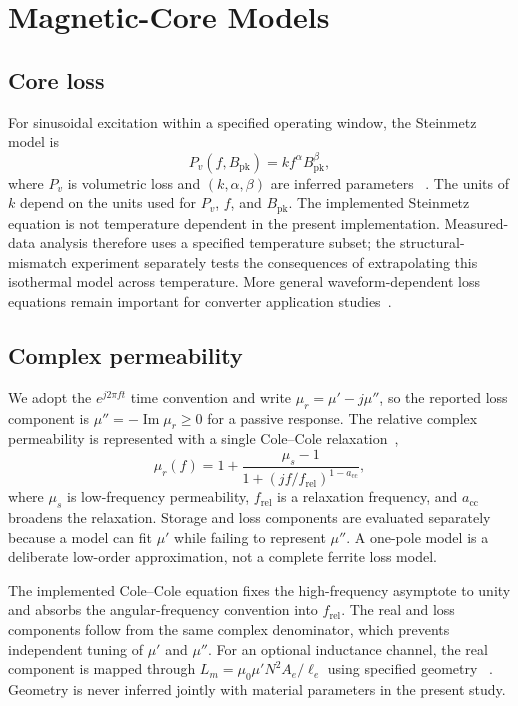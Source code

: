 \hypertarget{magnetic-core-models}{%
\section{Magnetic-Core Models}\label{magnetic-core-models}}

\hypertarget{core-loss}{%
\subsection{Core loss}\label{core-loss}}

For sinusoidal excitation within a specified operating window, the
Steinmetz model is
\[P_v(f,B_{\mathrm{pk}})=k f^{\alpha}B_{\mathrm{pk}}^{\beta},
  \label{eq:steinmetz}\] where \(P_v\) is volumetric loss and
\((k,\alpha,\beta)\) are inferred parameters ~\citep{steinmetz1892}. The
units of \(k\) depend on the units used for \(P_v\), \(f\), and
\(B_{\mathrm{pk}}\). The implemented Steinmetz equation is not
temperature dependent in the present implementation. Measured-data
analysis therefore uses a specified temperature subset; the
structural-mismatch experiment separately tests the consequences of
extrapolating this isothermal model across temperature. More general
waveform-dependent loss equations remain important for converter
application studies~\citep{reinert2001, muehlethaler2012}.

\hypertarget{complex-permeability}{%
\subsection{Complex permeability}\label{complex-permeability}}

We adopt the \(e^{j2\pi ft}\) time convention and write
\(\mu_r=\mu'-j\mu''\), so the reported loss component is
\(\mu''=-\operatorname{Im}\mu_r\geq0\) for a passive response. The
relative complex permeability is represented with a single Cole--Cole
relaxation~\citep{cole1941}, \[\mu_r(f)=1+\frac{\mu_s-1}
 {1+\left(jf/f_{\mathrm{rel}}\right)^{1-a_{\mathrm{cc}}}},
 \label{eq:colecole}\] where \(\mu_s\) is low-frequency permeability,
\(f_{\mathrm{rel}}\) is a relaxation frequency, and \(a_{\mathrm{cc}}\)
broadens the relaxation. Storage and loss components are evaluated
separately because a model can fit \(\mu'\) while failing to represent
\(\mu''\). A one-pole model is a deliberate low-order approximation, not
a complete ferrite loss model.

The implemented Cole--Cole equation fixes the high-frequency asymptote
to unity and absorbs the angular-frequency convention into
\(f_{\mathrm{rel}}\). The real and loss components follow from the same
complex denominator, which prevents independent tuning of \(\mu'\) and
\(\mu''\). For an optional inductance channel, the real component is
mapped through \(L_m=\mu_0\mu' N^2A_e/\ell_e\) using specified geometry
~\citep{snelling1988, mclyman2011}. Geometry is never inferred jointly
with material parameters in the present study.

